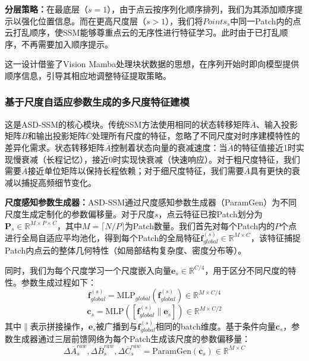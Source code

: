 \documentclass[preprint,12pt]{elsarticle}
\begin{document}
\textbf{分层策略：}在最底层（$s=1$），由于点云按序列化顺序排列，我们为其添加顺序提示以强化位置信息。而在更高尺度层（$s>1$），我们将$Points_s$中同一Patch内的点云打乱顺序，使SSM能够尊重点云的无序性进行特征学习。此时由于已打乱顺序，不再需要加入顺序提示。

这一设计借鉴了Vision Mamba\cite{VisionMamba}处理块状数据的思想，在序列开始时即向模型提供顺序信息，引导其相应地调整特征提取策略。


\subsubsection{基于尺度自适应参数生成的多尺度特征建模}

这是ASD-SSM的核心模块。传统SSM方法使用相同的状态转移矩阵$\overline{A}$、输入投影矩阵$\overline{B}$和输出投影矩阵$\overline{C}$处理所有尺度的特征，忽略了不同尺度对时序建模特性的差异化需求。状态转移矩阵$\overline{A}$控制着状态向量的衰减速度：当$\overline{A}$的特征值接近1时实现慢衰减（长程记忆），接近0时实现快衰减（快速响应）。对于粗尺度特征，我们需要$\overline{A}$接近单位矩阵以保持长程依赖；对于细尺度特征，我们需要$\overline{A}$具有更快的衰减以捕捉高频细节变化。

\textbf{尺度感知参数生成器：}ASD-SSM通过尺度感知参数生成器（ParamGen）为不同尺度生成定制化的参数偏移量。对于尺度$s$，点云特征已按Patch划分为$\mathbf{P}_s \in \mathbb{R}^{M \times P \times C}$，其中$M = \lceil N/P \rceil$为Patch数量。我们首先对每个Patch内的$P$个点进行全局自适应平均池化，得到每个Patch的全局特征$\mathbf{f}_{global}^{(s)} \in \mathbb{R}^{M \times C}$，该特征捕捉Patch内点云的整体几何特性（如局部结构复杂度、密度分布等）。

同时，我们为每个尺度学习一个尺度嵌入向量$\mathbf{e}_s \in \mathbb{R}^{C/4}$，用于区分不同尺度的特性。参数生成过程如下：
\begin{equation}
	\mathbf{f}_{global}^{(s)} = \text{MLP}_{global}(\mathbf{f}_{global}^{(s)}) \in \mathbb{R}^{M \times C/4}
\end{equation}
\begin{equation}
	\mathbf{c}_s = \text{MLP}([\mathbf{f}_{global}^{(s)} \| \mathbf{e}_s]) \in \mathbb{R}^{M \times C/2}
\end{equation}
其中$\|$表示拼接操作，$\mathbf{e}_s$被广播到与$\mathbf{f}_{global}^{(s)}$相同的batch维度。基于条件向量$\mathbf{c}_s$，参数生成器通过三层前馈网络为每个Patch生成该尺度的参数偏移量：
\begin{equation}
	\Delta\overline{A}_s^{raw}, \Delta\overline{B}_s^{raw}, \Delta\overline{C}_s^{raw} = \text{ParamGen}(\mathbf{c}_s) \in \mathbb{R}^{M \times C}
\end{equation}
\end{document}
